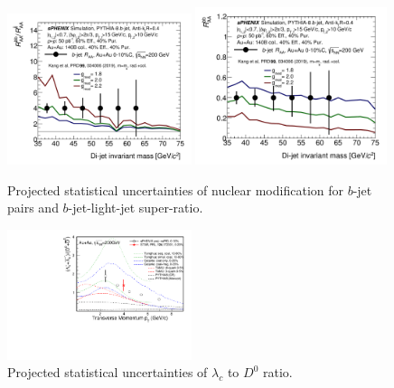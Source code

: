 \begin{figure}[htbp]
\centering
\includegraphics[width=0.48\textwidth]{figs/200pp_pythia8_CTEQ6L_7GeV_ALL_cfg_eneg_DSTReader_root_Draw_HFJetTruth_InvMass_CrossSection2RAARatio_Theory_3yr_deta0_70.pdf}
\includegraphics[width=0.5\textwidth]{figs/200pp_pythia8_CTEQ6L_7GeV_ALL_cfg_eneg_DSTReader_root_Draw_HFJetTruth_InvMass_CrossSection2RAA_Theory_3yr_deta0_70.pdf}
\caption{Projected statistical uncertainties of nuclear modification for $b$-jet pairs and $b$-jet-light-jet super-ratio.}
\label{fig:HF-bjet-pair}
\end{figure}



\begin{figure}[htbp]
\centering
\includegraphics[width=0.48\textwidth]{figs/LcD0_proj_0_10_24B_Update.pdf}
\caption{Projected statistical uncertainties of $\lambda_c$ to $D^0$ ratio.}
\label{fig:HF-Lc}
\end{figure}



